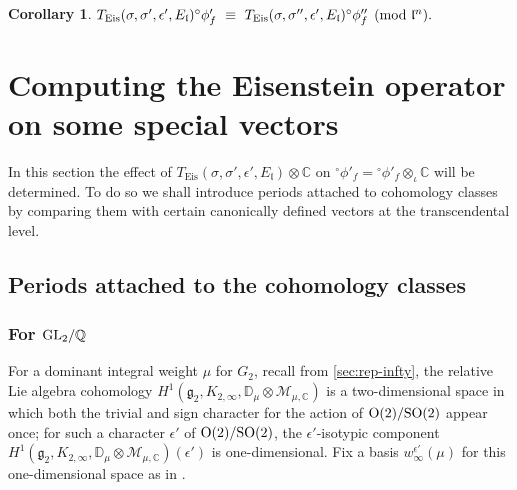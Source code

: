 \documentclass[11pt]{amsart}
\newtheorem{corollary}{Corollary}[section]
\begin{document}
\begin{corollary} 
$T_{\textup{Eis}}(\sigma, \sigma', \epsilon', E_\mathfrak{l}) {^\circ}\phi'_f  \ \equiv \ 
T_{\textup{Eis}}(\sigma, \sigma'', \epsilon',  E_\mathfrak{l}) {^\circ}\phi''_f \pmod{\mathfrak{l}^n}.$
\end{corollary}


\medskip
\section{Computing the Eisenstein operator on some special vectors}

In this section the effect of $T_{\text{Eis}}(\sigma, \sigma', \epsilon', E_\mathfrak{l}) \otimes \mathbb{C}$ on 
${ ^\circ}\phi'_f = {^\circ}\phi'_f \otimes_{\iota} \mathbb{C}$ will be determined. 
To do so we shall introduce periods attached to cohomology classes by comparing them with certain canonically defined vectors at the transcendental level.

 
\subsection{Periods attached to the cohomology classes}
\label{section: periods-attached-to-the-cohomology-classes}
\subsubsection{For ${\rm GL}_2/\mathbb{Q}$}

For a dominant integral weight $\mu$ for $G_2$, recall from \ref{sec:rep-infty}, 
the relative Lie algebra cohomology 
$H^{1}(\mathfrak{g}_2, K_{2, \infty}, \mathbb{D}_{\mu} \otimes \mathcal{M}_{\mu, \mathbb{C}})$ is 
a two-dimensional space in which both the trivial and sign character for the action of ${\rm O}(2)/{\rm SO}(2)$ appear once; 
for such a character $\epsilon'$ of ${\rm O}(2)/{\rm SO}(2)$, the $\epsilon'$-isotypic component 
$H^{1}(\mathfrak{g}_2, K_{2, \infty}, \mathbb{D}_{\mu} \otimes \mathcal{M}_{\mu, \mathbb{C}})(\epsilon')$ is one-dimensional. 
Fix a basis $w^{\epsilon'}_{\infty}(\mu)$ for this one-dimensional space as in \cite[Sect.\,5.2.1]{harder-raghuram}. 
\end{document}
